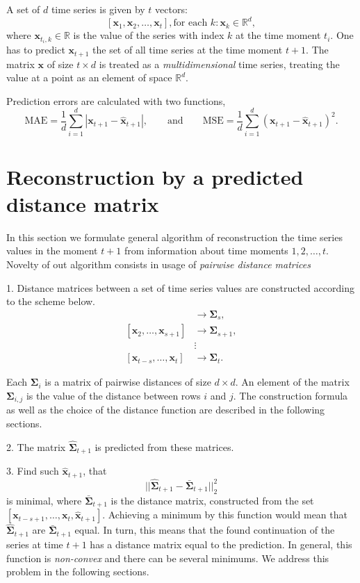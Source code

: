\documentclass[12pt]{article}
\begin{document}
A set of $d$ time series is given by $t$ vectors:
\[
[\mathbf{x}_1, \mathbf{x}_2, \ldots, \mathbf{x}_t], \text{for each } k: \mathbf{x}_k \in \mathbb{R}^d,
\]
where $\mathbf{x}_{t_i, k} \in \mathbb{R}$ is the value of the series with index $k$ at the time moment $t_i$.
One has to predict $\mathbf{x}_{t+1}$ the set of all time series at the time moment $t+1$. The matrix $\mathbf{x}$ of size $t \times d$ is treated as a \emph{multidimensional} time series, treating the value at a point as an element of space $\mathbb{R}^d$.

Prediction errors are calculated with two functions,
\[
\text{MAE} = \frac{1}{d}{\sum_{i=1}^{d} |\mathbf{x}_{t+1} - \mathbf{\hat{x}}_{t+1}|}, 
\qquad \text{and} \qquad 
\text{MSE} = \frac{1}{d}{\sum_{i=1}^{d} (\mathbf{x}_{t+1} - \mathbf{\hat{x}}_{t+1})^2}.
\]

\section{Reconstruction by a predicted distance matrix}

In this section we formulate general algorithm of reconstruction the time series values in the moment $t+1$ from information about time moments $1, 2, \ldots, t$. Novelty of out algorithm consists in usage of \emph{pairwise distance matrices}

1. Distance matrices between a set of time series values are constructed according to the scheme below.
\begin{align*}
	[\mathbf{x}_1, \ldots, \mathbf{x}_s] &\rightarrow \mathbf{\Sigma}_s, \\
	[\mathbf{x}_2, \ldots, \mathbf{x}_{s+1}] &\rightarrow \mathbf{\Sigma}_{s+1}, \\
	&\vdots \\
	[\mathbf{x}_{t-s}, \ldots, \mathbf{x}_t] &\rightarrow \mathbf{\Sigma}_{t}.
\end{align*}

Each $\mathbf{\Sigma}_i$ is a matrix of pairwise distances of size $d \times d$. An element of the matrix $\mathbf{\Sigma}_{i,j}$ is the value of the distance between rows $i$ and $j$. The construction formula as well as the choice of the distance function are described in the following sections.

2. The matrix $\hat{\mathbf{\Sigma}}_{t+1}$ is predicted from these matrices.

3. Find such $\mathbf{\hat{x}}_{t+1}$, that \[ ||\hat{\mathbf{\Sigma}}_{t+1} - \bar{\mathbf{\Sigma}}_{t+1}||_2^2 \] is minimal, where $\bar{\mathbf{\Sigma}}_{t+1}$ is the distance matrix, constructed from the set $[\mathbf{x}_{t-s+1}, \ldots, \mathbf{x}_{t}, \mathbf{\hat{x}}_{t+1}]$. Achieving a minimum by this function would mean that $\hat{\mathbf{\Sigma}}_{t+1}$ are $\bar{\mathbf{\Sigma}}_{t+1}$ equal. In turn, this means that the found continuation of the series at time $t+1$ has a distance matrix equal to the prediction. In general, this function is \emph{non-convex} and there can be several minimums. We address this problem in the following sections.
\end{document}
